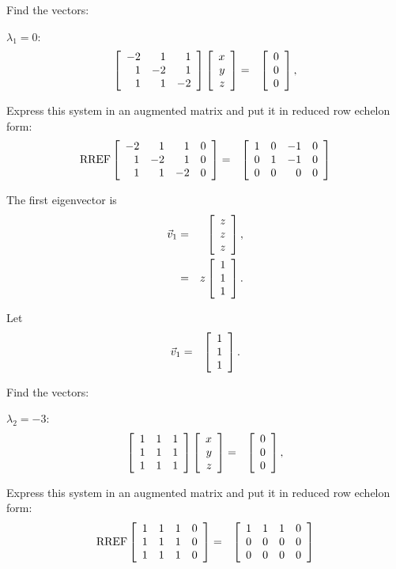 \begin{frame}
  Find the vectors:

  $\lambda_1 = 0$:
  \begin{eqnarray*}
    \left[ \begin{array}{rrr} -2 & 1 & 1 \\ 1 & -2 & 1 \\ 1 & 1 & -2 \end{array} \right]\left[ \begin{array}{r} x \\ y \\ z \end{array} \right] & = & \left[ \begin{array}{r} 0 \\ 0 \\ 0 \end{array} \right], \\
  \end{eqnarray*}

  Express this system in an augmented matrix and put it in reduced row
  echelon form:
  \begin{eqnarray*}
    \mathrm{RREF}\left[ \begin{array}{rrrr}
    -2 & 1 & 1 & 0 \\  
    1 & -2 & 1 & 0 \\ 
    1 & 1 & -2 & 0 \\ 
    \end{array} \right]
    & = & 
    \left[ \begin{array}{rrrr}
    1 & 0 & -1 & 0 \\  
    0 & 1 & -1 & 0 \\ 
    0 & 0 & 0 & 0 \\ 
    \end{array} \right]
  \end{eqnarray*}


\end{frame}

\begin{frame}
  The first eigenvector is 
  \begin{eqnarray*}
    \vec{v}_1 & = & \left[ \begin{array}{r} z \\ z \\ z \end{array} \right], \\
    & = & z \left[ \begin{array}{r} 1 \\ 1 \\ 1 \end{array} \right].
  \end{eqnarray*}

  Let
  \begin{eqnarray*}
    \vec{v}_1 & = & \left[ \begin{array}{r} 1 \\ 1 \\ 1 \end{array} \right].
  \end{eqnarray*}

\end{frame}

\begin{frame}
  Find the vectors:

  $\lambda_2 = -3$:
  \begin{eqnarray*}
    \left[ \begin{array}{rrr} 1 & 1 & 1 \\ 1 & 1 & 1 \\ 1 & 1 & 1 \end{array} \right]
    \left[ \begin{array}{r} x \\ y \\ z \end{array} \right] & = & \left[ \begin{array}{r} 0 \\ 0 \\ 0 \end{array} \right], \\
  \end{eqnarray*}

  Express this system in an augmented matrix and put it in reduced row
  echelon form:
  \begin{eqnarray*}
    \mathrm{RREF}\left[ \begin{array}{rrrr}
    1 & 1 & 1 & 0 \\  
    1 & 1 & 1 & 0 \\ 
    1 & 1 & 1 & 0 \\ 
    \end{array} \right]
    & = & 
    \left[ \begin{array}{rrrr}
    1 & 1 & 1 & 0 \\  
    0 & 0 & 0 & 0 \\ 
    0 & 0 & 0 & 0 \\ 
    \end{array} \right]
  \end{eqnarray*}

\end{frame}

